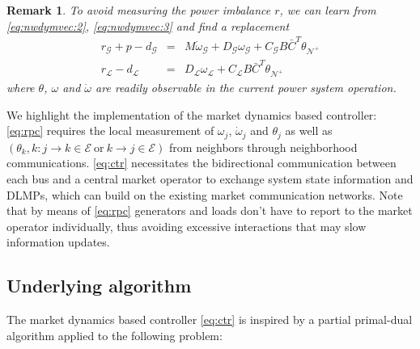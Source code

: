 \documentclass[journal,12pt,onecolumn,draftclsnofoot]{IEEEtran}
\newtheorem{remark}{\textbf{Remark}}
\begin{document}
\begin{remark}
	To avoid measuring the power imbalance $r$, we can learn from \eqref{eq:nwdymvec:2}, \eqref{eq:nwdymvec:3} and find a replacement 
\begin{subequations}
	\begin{eqnarray}
	 r_\mathcal{G} +p  - d_\mathcal{G}  & = & M \dot \omega_\mathcal{G}    + D_\mathcal{G}  \omega_\mathcal{G}  + C_{\mathcal{G}}B  \bar C^T \theta_{\mathcal{N}^+}   \\
	 r_{\mathcal{L}} - d_{\mathcal{L}} & =& D_{\mathcal{L}} \omega_{\mathcal{L}} + C_{\mathcal{L}}B \bar C^T\theta_{\mathcal{N}^+} 
	\end{eqnarray}\label{eq:rpc}
\end{subequations}
where $\theta$, $\omega$ and $\dot \omega$ are readily observable in the current power system operation.
\end{remark}  

We highlight the implementation of the market dynamics based controller: \eqref{eq:rpc} requires the local measurement of $\omega_j$, $\dot \omega_j$ and $\theta_j$ as well as $(\theta_k, k: j\rightarrow k \in\mathcal{E}~\mathrm{or}~k\rightarrow j \in\mathcal{E})$ from neighbors through neighborhood communications. \eqref{eq:ctr} necessitates the bidirectional communication between each bus and a central market operator to exchange system state information and DLMPs, which can build on the existing market communication networks. Note that by means of \eqref{eq:rpc} generators and loads don't have to report to the market operator individually, thus avoiding excessive interactions that may slow information updates.




\subsection{Underlying algorithm} 

The market dynamics based controller \eqref{eq:ctr} is inspired by a partial primal-dual algorithm applied to the following problem:
\end{document}
